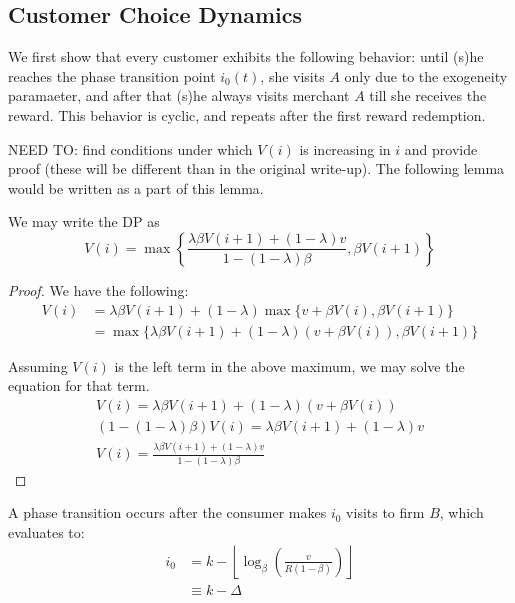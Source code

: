 \subsection{Customer Choice Dynamics}
We first show that every customer exhibits the following behavior: until (s)he reaches the phase transition point $i_0(t)$, she visits $A$ only due to the exogeneity paramaeter, and after that (s)he always visits merchant $A$ till she receives the reward.
This behavior is cyclic, and repeats after the first reward redemption.

NEED TO: find conditions under which $V(i)$ is increasing in $i$ and provide proof (these will be different than in the original write-up). The following lemma would be written as a part of this lemma. \\

\begin{lemma} We may write the DP as
\begin{equation*}
V(i) = \max\left\{ \frac{\lambda \beta V(i+1)+(1-\lambda)v}{1-(1-\lambda)\beta}, \beta V(i+1) \right\}
\end{equation*}
\end{lemma}

\begin{proof}
We have the following:
\begin{align*}
V(i) &= \lambda \beta V(i+1) + (1-\lambda)\max\{v +\beta V(i), \beta V(i+1) \} \\
&= \max\{\lambda \beta V(i+1) + (1-\lambda)(v+\beta V(i)), \beta V(i+1) \}
\end{align*}

Assuming $V(i)$ is the left term in the above maximum, we may solve the equation for that term.
\begin{gather*}
V(i) = \lambda \beta V(i+1) + (1-\lambda)(v+\beta V(i)) \\
(1-(1-\lambda)\beta) V(i) = \lambda \beta V(i+1) + (1-\lambda)v \\
V(i) = \frac{\lambda \beta V(i+1) + (1-\lambda)v}{1-(1-\lambda)\beta}
\end{gather*}\end{proof}

\begin{theorem} A phase transition occurs after the consumer makes $i_0$ visits to firm $B$, which evaluates to:
\begin{align*}
i_0 &= k - \left\lfloor \log_{\beta}\left(\frac{v}{R(1-\beta)}\right)\right\rfloor \\
&\equiv k-\Delta
\end{align*}
\end{theorem}


